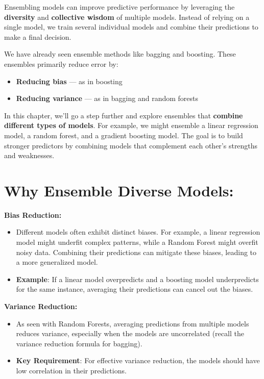 \documentclass[
  letterpaper,
  DIV=11,
  numbers=noendperiod]{scrreprt}
\providecommand{\tightlist}{%
  \setlength{\itemsep}{0pt}\setlength{\parskip}{0pt}}\usepackage{longtable,booktabs,array}
\begin{document}
Ensembling models can improve predictive performance by leveraging the
\textbf{diversity} and \textbf{collective wisdom} of multiple models.
Instead of relying on a single model, we train several individual models
and combine their predictions to make a final decision.

We have already seen ensemble methods like bagging and boosting. These
ensembles primarily reduce error by:

\begin{itemize}
\item
  \textbf{Reducing bias} --- as in boosting
\item
  \textbf{Reducing variance} --- as in bagging and random forests
\end{itemize}

In this chapter, we'll go a step further and explore ensembles that
\textbf{combine different types of models}. For example, we might
ensemble a linear regression model, a random forest, and a gradient
boosting model. The goal is to build stronger predictors by combining
models that complement each other's strengths and weaknesses.

\section{Why Ensemble Diverse
Models:}\label{why-ensemble-diverse-models}

\textbf{Bias Reduction:}

\begin{itemize}
\tightlist
\item
  Different models often exhibit distinct biases. For example, a linear
  regression model might underfit complex patterns, while a Random
  Forest might overfit noisy data. Combining their predictions can
  mitigate these biases, leading to a more generalized model.
\item
  \textbf{Example}: If a linear model overpredicts and a boosting model
  underpredicts for the same instance, averaging their predictions can
  cancel out the biases.
\end{itemize}

\textbf{Variance Reduction:}

\begin{itemize}
\tightlist
\item
  As seen with Random Forests, averaging predictions from multiple
  models reduces variance, especially when the models are uncorrelated
  (recall the variance reduction formula for bagging).
\item
  \textbf{Key Requirement}: For effective variance reduction, the models
  should have low correlation in their predictions.
\end{itemize}
\end{document}
